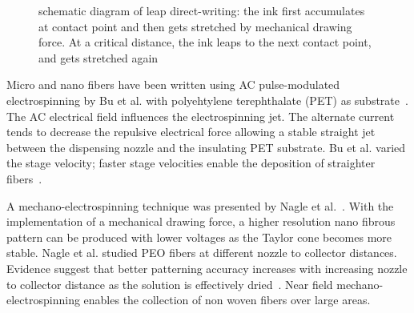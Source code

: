 \documentclass[5p,,preprint,12pt,twocolumn]{elsarticle}
\makeatletter
\def\fixFloatSize#1{}%
\makeatother
\begin{document}
\bgroup
\fixFloatSize{images/db7d3b35-fe08-422f-afe4-78e0133b489b-uhuang_00.png}
\begin{figure}[!htbp]
\centering \makeatletter{}
\makeatother 
\caption{{schematic diagram of leap direct-writing: the ink first accumulates at contact point and then gets stretched by mechanical drawing force. At a critical distance, the ink leaps to the next contact point, and gets stretched again \unskip~\protect\cite{527120:11974311}}}
\label{f-7587d8081ccc}
\end{figure}
\egroup
Micro and nano fibers have been written using AC pulse-modulated electrospinning by Bu et al. with polyehtylene terephthalate (PET) as substrate\unskip~\cite{527120:11974304}. The AC electrical field influences the electrospinning jet. The alternate current tends to decrease the repulsive electrical force allowing a stable straight jet between the dispensing nozzle and the insulating PET substrate. Bu et al. varied the stage velocity; faster stage velocities enable the deposition of straighter fibers\unskip~\cite{527120:11974304}.

 A mechano-electrospinning technique was presented by Nagle et al.\unskip~\cite{527120:12033656}. With the implementation of a mechanical drawing force, a higher resolution nano fibrous pattern can be produced with lower voltages as the Taylor cone becomes more stable. Nagle et al. studied PEO fibers at different nozzle to collector distances. Evidence suggest that better patterning accuracy increases with increasing nozzle to collector distance as the solution is effectively dried\unskip~\cite{527120:12033656}. Near field mechano-electrospinning enables the collection of non woven fibers over large areas.
\end{document}
